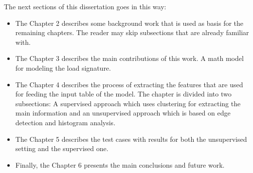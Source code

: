 The next sections of this dissertation goes in this way:
\begin{itemize}
\item The Chapter 2 describes some background work that is used as basis for the remaining chapters. The reader may skip subsections that are already familiar with. 
\item The Chapter 3 describes the main contributions of this work. A math model for modeling the load signature. 
\item The Chapter 4 describes the process of extracting the features that are used for feeding the input table of the model. The chapter is divided into two subsections: A supervised approach which uses clustering for extracting the main information and an unsupervised approach which is based on edge detection and histogram analysis.
\item The Chapter 5 describes the test cases with results for both the unsupervised setting and the supervised one. 
\item Finally, the Chapter 6 presents the main conclusions and future work. 
\end{itemize}
